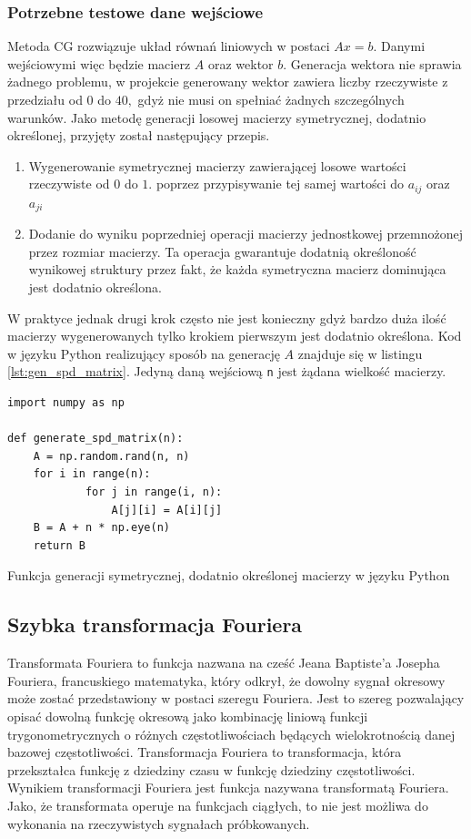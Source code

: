 \documentclass[a4paper,12pt]{book} %
\begin{document}
\subsubsection{Potrzebne testowe dane wejściowe}
Metoda CG rozwiązuje układ równań liniowych w postaci $Ax = b.$ Danymi wejściowymi więc będzie macierz $A$ oraz wektor $b$. Generacja wektora nie sprawia żadnego problemu, w projekcie generowany wektor zawiera liczby rzeczywiste z przedziału od $0$ do $40,$ gdyż nie musi on spełniać żadnych szczególnych warunków.
Jako metodę generacji losowej macierzy symetrycznej, dodatnio określonej, przyjęty został następujący przepis.
\begin{enumerate}
		\item Wygenerowanie symetrycznej macierzy zawierającej losowe wartości rzeczywiste od $0$ do $1.$ poprzez przypisywanie tej samej wartości do $a_{ij}$ oraz $a_{ji}$
		\item Dodanie do wyniku poprzedniej operacji macierzy jednostkowej przemnożonej przez rozmiar macierzy. Ta operacja gwarantuje dodatnią określoność wynikowej struktury przez fakt, że każda symetryczna macierz dominująca jest dodatnio określona.
\end{enumerate}
W praktyce jednak drugi krok często nie jest konieczny gdyż bardzo duża ilość macierzy wygenerowanych tylko krokiem pierwszym jest dodatnio określona.
Kod w języku Python realizujący sposób na generację $A$ znajduje się w listingu \ref{lst:gen_spd_matrix}. Jedyną daną wejściową \texttt{n} jest żądana wielkość macierzy.

\begin{lstfloat}[H]
\lstset{language=Python}
\begin{lstlisting}[frame=single]
import numpy as np

def generate_spd_matrix(n):
	A = np.random.rand(n, n)
	for i in range(n):
    		for j in range(i, n):
        		A[j][i] = A[i][j]
	B = A + n * np.eye(n)
	return B
\end{lstlisting}
\caption{Funkcja generacji symetrycznej, dodatnio określonej macierzy w języku Python}
\label{lst:gen_spd_matrix}
\end{lstfloat}

\subsection{Szybka transformacja Fouriera}
Transformata Fouriera to funkcja nazwana na cześć Jeana Baptiste'a Josepha Fouriera, francuskiego matematyka, który odkrył, że dowolny sygnał okresowy może zostać przedstawiony w postaci szeregu Fouriera. Jest to szereg pozwalający opisać dowolną funkcję okresową jako kombinację liniową funkcji trygonometrycznych o różnych częstotliwościach będących wielokrotnością danej bazowej częstotliwości. Transformacja Fouriera to transformacja, która przekształca funkcję z dziedziny czasu w funkcję dziedziny częstotliwości. Wynikiem transformacji Fouriera jest funkcja nazywana transformatą Fouriera. Jako, że transformata operuje na funkcjach ciągłych, to nie jest możliwa do wykonania na rzeczywistych sygnałach próbkowanych. 
\end{document}
